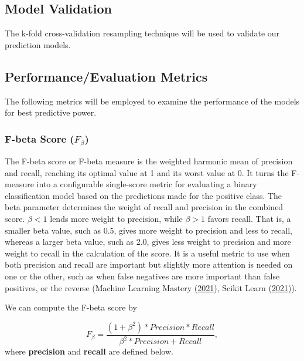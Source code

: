 \documentclass[
  10pt,
]{article}
\begin{document}
\hypertarget{model-validation}{%
\subsection{Model Validation}\label{model-validation}}

The k-fold cross-validation resampling technique will be used to validate our prediction models.

\hypertarget{performanceevaluation-metrics}{%
\subsection{Performance/Evaluation Metrics}\label{performanceevaluation-metrics}}

The following metrics will be employed to examine the performance of the models for best predictive power.

\hypertarget{f-beta-score-f_beta}{%
\subsubsection{\texorpdfstring{F-beta Score (\(F_\beta\))}{F-beta Score (F\_\textbackslash beta)}}\label{f-beta-score-f_beta}}

The F-beta score or F-beta measure is the weighted harmonic mean of precision and recall, reaching its optimal value at 1 and its worst value at 0. It turns the F-measure into a configurable single-score metric for evaluating a binary classification model based on the predictions made for the positive class. The beta parameter determines the weight of recall and precision in the combined score. \(\beta < 1\) lends more weight to precision, while \(\beta > 1\) favors recall. That is, a smaller beta value, such as 0.5, gives more weight to precision and less to recall, whereas a larger beta value, such as 2.0, gives less weight to precision and more weight to recall in the calculation of the score. It is a useful metric to use when both precision and recall are important but slightly more attention is needed on one or the other, such as when false negatives are more important than false positives, or the reverse (Machine Learning Mastery (\protect\hyperlink{ref-MLM}{2021}), Scikit Learn (\protect\hyperlink{ref-scikit_learn}{2021})).

We can compute the F-beta score by

\[
  F_\beta = \frac{(1 + \beta^2) * Precision * Recall}{\beta^2 * Precision + Recall},
\]
where \textbf{precision} and \textbf{recall} are defined below.
\end{document}

